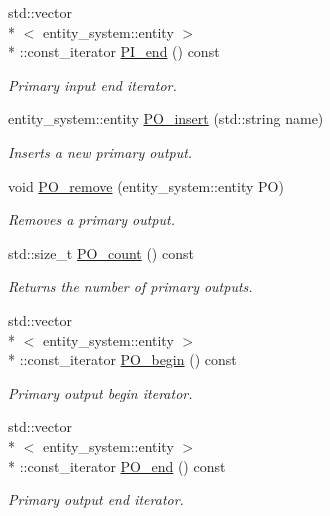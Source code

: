 \begin{DoxyCompactItemize}
std\-::vector\\*
$<$ entity\-\_\-system\-::entity $>$\\*
\-::const\-\_\-iterator \hyperlink{classophidian_1_1netlist_1_1netlist_a753045aaa11f586ce36bb63b6588a5c5}{P\-I\-\_\-end} () const 
\begin{DoxyCompactList}\small\item\em Primary input end iterator. \end{DoxyCompactList}\item 
entity\-\_\-system\-::entity \hyperlink{classophidian_1_1netlist_1_1netlist_af8cc14bf5d26331317ba74b9d8791f7b}{P\-O\-\_\-insert} (std\-::string name)
\begin{DoxyCompactList}\small\item\em Inserts a new primary output. \end{DoxyCompactList}\item 
void \hyperlink{classophidian_1_1netlist_1_1netlist_ac31c4d0116ae4bf91244d06c7e0d0499}{P\-O\-\_\-remove} (entity\-\_\-system\-::entity P\-O)
\begin{DoxyCompactList}\small\item\em Removes a primary output. \end{DoxyCompactList}\item 
std\-::size\-\_\-t \hyperlink{classophidian_1_1netlist_1_1netlist_a560619b3deea1b719a9280b0021144b1}{P\-O\-\_\-count} () const 
\begin{DoxyCompactList}\small\item\em Returns the number of primary outputs. \end{DoxyCompactList}\item 
std\-::vector\\*
$<$ entity\-\_\-system\-::entity $>$\\*
\-::const\-\_\-iterator \hyperlink{classophidian_1_1netlist_1_1netlist_a46f6bdfde20f56212066d98ec18c6b8d}{P\-O\-\_\-begin} () const 
\begin{DoxyCompactList}\small\item\em Primary output begin iterator. \end{DoxyCompactList}\item 
std\-::vector\\*
$<$ entity\-\_\-system\-::entity $>$\\*
\-::const\-\_\-iterator \hyperlink{classophidian_1_1netlist_1_1netlist_a2265605911aa92673eb0ea559a227b46}{P\-O\-\_\-end} () const 
\begin{DoxyCompactList}\small\item\em Primary output end iterator. \end{DoxyCompactList}\end{DoxyCompactItemize}


